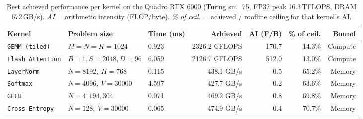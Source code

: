 \begin{table}[h]
  \centering
  \small
  \begin{tabular}{lllrrrr}
    \toprule
    \textbf{Kernel} & \textbf{Problem size} & \textbf{Time (ms)} & \textbf{Achieved} & \textbf{AI (F/B)} & \textbf{\% of ceil.} & \textbf{Bound} \\
    \midrule
  \texttt{GEMM (tiled)} & $M=N=K=1024$ & 0.923 & 2326.2 GFLOPS & 170.7 & 14.3\% & Compute \\
  \texttt{Flash Attention} & $B=1,S=2048,D=96$ & 6.059 & 2126.7 GFLOPS & 512.0 & 13.0\% & Compute \\
  \texttt{LayerNorm} & $N=8192,\ H=768$ & 0.115 & 438.1 GB/s & 0.5 & 65.2\% & Memory \\
  \texttt{Softmax} & $N=4096,\ V=30000$ & 4.597 & 427.7 GB/s & 0.2 & 63.6\% & Memory \\
  \texttt{GELU} & $N=4,194,304$ & 0.071 & 469.2 GB/s & 0.8 & 69.8\% & Memory \\
  \texttt{Cross-Entropy} & $N=128,\ V=30000$ & 0.065 & 474.9 GB/s & 0.4 & 70.7\% & Memory \\
    \bottomrule
  \end{tabular}
  \caption{Best achieved performance per kernel on the Quadro RTX 6000 (Turing sm\_75, FP32 peak 16.3\,TFLOPS, DRAM 672\,GB/s). \emph{AI} = arithmetic intensity (FLOP/byte). \emph{\% of ceil.} = achieved / roofline ceiling for that kernel's AI.}
  \label{tab:m3_perf}
\end{table}
